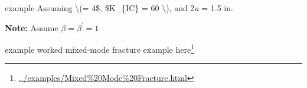 \documentclass[
  letterpaper,
  ignorenonframetext,
  aspectratio=43,
  handout,
  12pt]{beamer}
\DeclareRobustCommand{\href}[2]{#2\footnote{\url{#1}}}
\begin{document}
\begin{frame}{example}
\protect\hypertarget{example-2}{}
Assuming \textbackslash(\sigma = 4\tau\$, \$K\_\{IC\} = 60 
\textbackslash), and 2\emph{a} = 1.5 in.

\textbf{Note:} Assume \(\beta = \beta^\prime = 1\)
\end{frame}

\begin{frame}{example}
\protect\hypertarget{example-3}{}
worked mixed-mode fracture example
\href{../examples/Mixed\%20Mode\%20Fracture.html}{here}
\end{frame}
\end{document}
